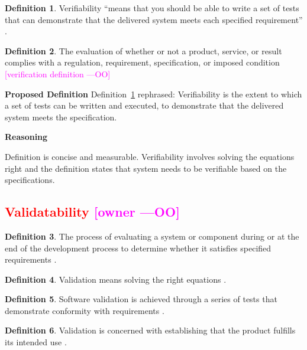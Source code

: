 \documentclass[letterpaper, cleveref]{lipics-v2019}
\newcommand{\authornote}[3]{\textcolor{#1}{[#3 ---#2]}}
\newcommand{\authornote}[3]{}
\newcommand{\oo}[1]{\authornote{magenta}{OO}{#1}} %
\newcommand{\notdone}[1]{\textcolor{red}{#1}}
\theoremstyle{definition}
\newtheorem{defn}{Definition}
\begin{document}
\begin{defn} \label{Defn_Verifiability1}
  Verifiability ``means that you should be able to write a set of tests that
  can demonstrate that the delivered system meets each specified
  requirement'' \citep{sommerville}. %
\end{defn}

\begin{defn}
	The evaluation of whether or not a product, service, or result complies
  with a regulation, requirement, specification, or imposed condition
  \citep{project2017guide} \oo {verification definition}
\end{defn}

\noindent \textbf{Proposed Definition} Definition~\ref{Defn_Verifiability1}
rephrased: Verifiability is the extent to which a set of tests can be
written and executed, to demonstrate that the delivered system meets the
specification.

\noindent \textbf{Reasoning} 

Definition is concise and measurable.  Verifiability involves solving the
equations right \citep[p.~23]{Roache1998} and the definition states that
system needs to be verifiable based on the specifications.


\subsection{\notdone{Validatability} \oo{owner}}

\begin{defn} \label{Defn_Validatability}
  The process of evaluating a system or component during or at the end of the
  development process to determine whether it satisfies specified requirements
  \citep{IEEEStdGlossarySET1990}.
\end{defn}

\begin{defn}
  Validation means solving the right equations \citep[p.~23]{Roache1998}.
\end{defn}

\begin{defn}
  Software validation is achieved through a series of tests that demonstrate
  conformity with requirements \citep{pressman2005software}.
\end{defn}

\begin{defn}
	Validation is concerned with establishing that the product fulfills its
	intended use \citep{van2008software}.
\end{defn}
\end{document}
